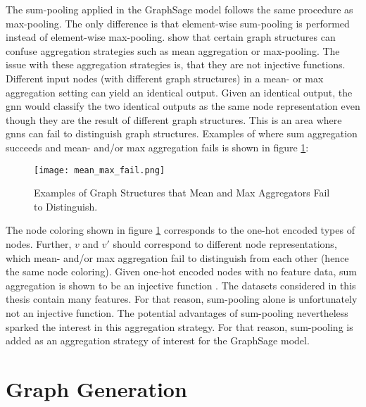 	\noindent The sum-pooling applied in the GraphSage model follows the same 
	procedure as max-pooling. The only difference is that element-wise 
	sum-pooling is performed instead of element-wise max-pooling. 
	\cite{xu2019powerful} show that certain graph structures can confuse 
	aggregation strategies such as mean aggregation or max-pooling. The issue with 
	these aggregation strategies is, that they are not injective functions. 
	Different input nodes (with different graph structures) in a mean- or 
	max aggregation setting can yield an identical output. Given an 
	identical output, the \acs{gnn} would classify the two identical outputs as the 
	same node representation even though they are the result of different graph
	structures. This is an area where \acsp{gnn} can fail to distinguish graph 
	structures. Examples of where sum aggregation succeeds and mean- and/or max 
	aggregation fails is shown in figure \ref{fig:graph_structures}:

	\begin{figure}[h]
		\centering
		\texttt{[image: mean\_max\_fail.png]}
		\caption{Examples of Graph Structures that Mean and Max Aggregators 
        Fail to Distinguish.}
        \label{fig:graph_structures}
        \cite[p. 6]{xu2019powerful}
	\end{figure}

	\noindent The node coloring shown in figure \ref{fig:graph_structures}
	corresponds to the one-hot encoded types of nodes. Further, $v$ and $v'$ should
	correspond to different node representations, which mean- and/or max
	aggregation fail to distinguish from each other (hence the same node coloring). 
	Given one-hot encoded nodes with no feature data, sum aggregation is shown to 
	be an injective function \citep[p. 5]{xu2019powerful}. The datasets
	considered in this thesis contain many features. For that reason,
	sum-pooling alone is unfortunately not an injective function. The potential
	advantages of sum-pooling nevertheless sparked the interest in this
	aggregation strategy. For that reason, sum-pooling is added as an 
	aggregation strategy of interest for the GraphSage model.

	\section{Graph Generation}
	\label{section:theory_graphgen} 


